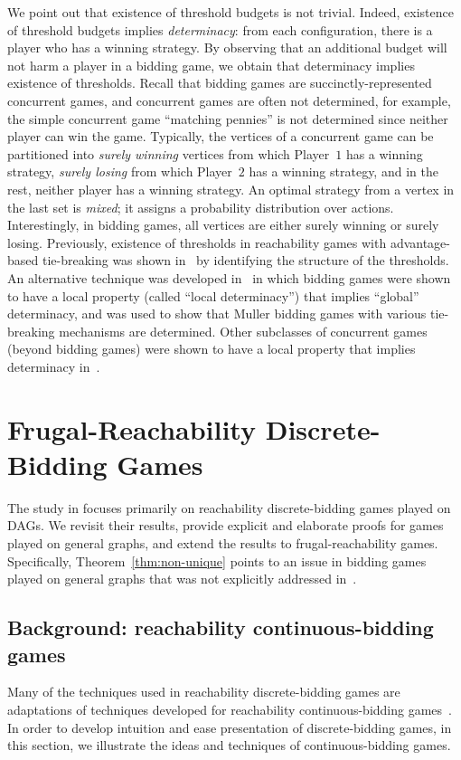 \documentclass{article}\providecommand{\nequiv}{\not\equiv}\usepackage[a4paper,margin=20mm]{geometry}
\newcommand{\PO}{Player~$1$\xspace}
\newcommand{\PT}{Player~$2$\xspace}
\begin{document}
\begin{remark}
We point out that existence of threshold budgets is not trivial. 
Indeed, existence of threshold budgets implies {\em determinacy}: from each configuration, there is a player who has a winning strategy. 
By observing that an additional budget will not harm a player in a bidding game, we obtain that determinacy implies existence of thresholds.
Recall that bidding games are succinctly-represented concurrent games, and concurrent games are often not determined, for example, the simple concurrent game ``matching pennies'' is not determined since neither player can win the game. 
Typically, the vertices of a concurrent game can be partitioned into {\em surely winning} vertices from which \PO has a winning strategy, {\em surely losing} from which \PT has a winning strategy, and in the rest, neither player has a winning strategy. An optimal strategy from a vertex in the last set is {\em mixed}; it assigns a probability distribution over actions. 
Interestingly, in bidding games, all vertices are either surely winning or surely losing. 
Previously, existence of thresholds in reachability games with advantage-based tie-breaking was shown in~\cite{DP10} by identifying the structure of the thresholds. An alternative technique was developed in~\cite{AAH21} in which bidding games were shown to have a local property (called ``local determinacy'') that implies ``global'' determinacy, and was used to show that Muller bidding games with various tie-breaking mechanisms are determined. Other subclasses of concurrent games (beyond bidding games) were shown to have a local property that implies determinacy in~\cite{BBR21}.
\end{remark}


\section{Frugal-Reachability Discrete-Bidding Games}
The study in \cite{DP10} focuses primarily on reachability discrete-bidding games played on DAGs. 
We revisit their results, provide explicit and elaborate proofs for games played on general graphs, and extend the results to frugal-reachability games. 
Specifically, Theorem~\ref{thm:non-unique} points to an issue in bidding games played on general graphs that was not explicitly addressed in~\cite{DP10}.




\subsection{Background: reachability continuous-bidding games}
Many of the techniques used in reachability discrete-bidding games are adaptations of techniques developed for reachability continuous-bidding games~\cite{LLPU96,LLPSU99}. 
In order to develop intuition and ease presentation of discrete-bidding games, in this section, we illustrate the ideas and techniques of continuous-bidding games.
\end{document}
